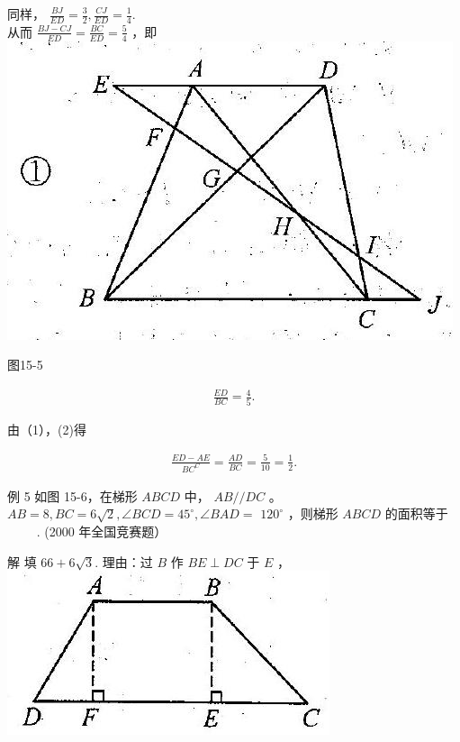 \documentclass[10pt]{article}
\begin{document}
同样， $\frac{B J}{E D}=\frac{3}{2}, \frac{C J}{E D}=\frac{1}{4}$.\\
从而 $\frac{B J-C J}{E D}=\frac{B C}{E D}=\frac{5}{4}$ ，即\\
\includegraphics[max width=\textwidth, center]{2024_10_30_2c8f45efd4a519b08e1ag-139}

图15-5

\begin{align*}
\frac{E D}{B C}=\frac{4}{5} . \tag{2}
\end{align*}

由（1），(2)得

\begin{align*}
\frac{E D-A E}{B C^{C}}=\frac{A D}{B C}=\frac{5}{10}=\frac{1}{2} .
\end{align*}

例 5 如图 15-6，在梯形 $A B C D$ 中， $A B / / D C$ 。 $A B=8, B C=6 \sqrt{2}, \angle B C D=45^{\circ}, \angle B A D=$ $120^{\circ}$ ，则梯形 $A B C D$ 的面积等于 $\qquad$ . (2000 年全国竞赛题）

解 填 $66+6 \sqrt{3}$. 理由：过 $B$ 作 $B E \perp D C$ 于 $E$ ，\\
\includegraphics[max width=\textwidth, center]{2024_10_30_2c8f45efd4a519b08e1ag-140}
\end{document}
